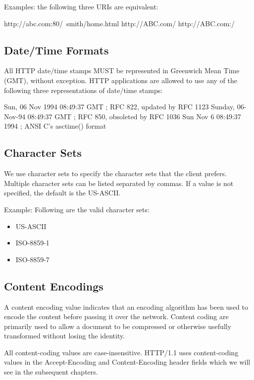 \documentclass[a4paper,11pt,bahasa]{extarticle}
\begin{document}
Examples: the following three URIs are equivalent:
\begin{textcode}
http://abc.com:80/~smith/home.html
http://ABC.com/%
http://ABC.com:/%
\end{textcode}

\subsection{Date/Time Formats}

All HTTP date/time stamps MUST be represented in Greenwich Mean Time (GMT), without exception. HTTP 
applications are allowed to use any of the following three representations of date/time stamps:

\begin{textcode}
Sun, 06 Nov 1994 08:49:37 GMT  ; RFC 822, updated by RFC 1123
Sunday, 06-Nov-94 08:49:37 GMT ; RFC 850, obsoleted by RFC 1036
Sun Nov  6 08:49:37 1994       ; ANSI C's asctime() format
\end{textcode}

\subsection{Character Sets}

We use character sets to specify the character sets that the client prefers. Multiple
character sets can  be listed separated by commas. If a
value is not specified, the default is the US-ASCII.

Example: Following are the valid character sets:
\begin{itemize}
\item US-ASCII
\item ISO-8859-1
\item ISO-8859-7
\end{itemize}

\subsection{Content Encodings}

A content encoding value indicates that an encoding algorithm has been used to encode the
content before passing it over the network. Content coding are primarily used to allow a document to be 
compressed or otherwise usefully transformed without losing the identity.

All content-coding values are case-insensitive. HTTP/1.1 uses content-coding values in the 
Accept-Encoding and Content-Encoding header fields which we will see in the subsequent chapters.
\end{document}
